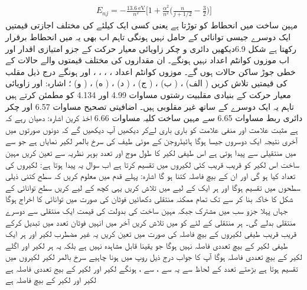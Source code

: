 \begin{align}
E_{nj} = - \frac{\SI{13.6}{\electronvolt}}{n^2} \big [ 1 + \frac{\alpha^2}{n^2} \big ( \frac{n}{j + 1/2} - \frac{3}{2} \big ) \big ]
\end{align}
مہین ساخت  میں انحطاط کو توڑتا ہے یعنی کسی ایک  کیلئے  کی مختلف اجازتی قیمتیں ایک دوسرے جیسی توانائی کے حامل نہیں ہونگی تاہم اب بھی یہ  میں انحطاط  برقرار رکھتا ہے شکل 6.9دیکھیں دائری و چکر زاویائی معیار حرکت  کے  جزو امتیازی اقدار  اور  اب موزوں کوانٹم اعداد نہیں ہونگے۔ ان مقداروں کی مختلف قیمتوں والے حالات کے خطی جوڑ ساکن حالات ہوں گے۔ ‏موزوں کوانٹم اعداد ، ، ، ، اور  ہونگے 
درج ذیل مقلب کی قیمتیں تلاش کریں
 ( الف) ، ( ب) ، ( ج) ، ( د) ، ( ه) ، ( و) ؛ اشارہ:  اور  زاویائی معیار حرکت کے بنیادی مقلبیت رشتوں مساوات 4.99 اور 4.134 کو مطمئن کرتے ہیں تاہم یہ ایک دوسرے کے ساتھ غیر مقلوبی ہیں۔ 
اضافیتی تصحیح مساوات 6.57 اور چکر دائری ربط مساوات 6.65 سے مہین ساخت کلیہ مساوات 6.66 اخذ کرين اشارہ: دھیان رہے کہ  ہے مثبت علامت اور منفی علامت کو باری باری لےکر دیکھیں آپ دیکھیں گے کہ دونوں صورتوں میں آخری نتیجہ ایک دوسروں جیسا ہوگا 
 ہائیڈروجن کے موئی طيف کی سرخ بالمر لکیر نمایاں ہے جو  سے  میں منتقيلی سے پیدا ہوتی ہے اس طیفی  لکیر کا طول موج اور تعدد بوہر نظریہ سے تعین کریں مہین ساخت اس لکیر کو قریب قریب کئی لکیروں میں تقسیم کرتا ہے اب سوال یہ پیدا ہوتا ہے: لکیروں کی تعداد کیا ہو گی  اور ان  کے بیچ فاصلہ کتنا ہو گا اشارہ: پہلے قدم میں معلوم کریں کہ  سطح کتنی ذیلی سطحوں میں تقسیم ہوگا اور ہر ایک کے لیے  میں  تلاش کریں یہی کچھ  کے لیے کریں سطح توانائی کے شکل کا خاکہ بنا کر  سے  تک تمام   ممکنہ منتقلی دکھائیں فوٹان کی صورت میں توانائی کا اخراج     ہوگا جہاں پہلا جزو سب میں مشترک  جبکہ مہین ساخت کی      بدولت   کی قیمت  ایک منتقلی سے دوسرے منتقلی  بدلے گی۔        ہر منتقلی کے لئے  کو  میں تلاش         کریں آخر میں انہیں فوٹان تعدد میں تبدیل کرکے قریب قریب طیفی لکیروں کے بیچ فاصلہ  کی صورت   میں تعین کریں یہ غیر مضطرب لکیر اور ہر ایک طیفی لکیر کے بیچ تعددی فاصلہ نہیں ہوگا جو یقینا قابل مشاہدہ نہیں ہے بلکہ یہ ہر لکیر اور اگلے لکیر کے بیچ تعددی فاصلہ ہوگا آپ کا جواب درج ذیل روپ میں ہونا چاہیے سرخ بالمر لکیر  لکیروں میں تقسیم ہوتا ہے بڑھتے تعدد کے لحاظ سے یہ   سے ،   سے ،  ہونگے لکیر  اور لکیر  کے بیج تعددی فاصلہ   ہے لکیر  اور لکیر  کے بیچ فاصلہ   ہے  
